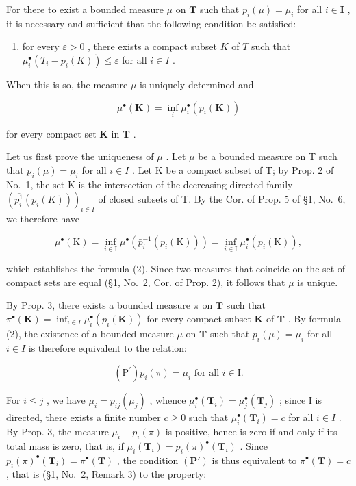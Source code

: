 For there to exist a bounded measure \(\mu\) on \(\mathbf{T}\) such that \(p_i(\mu) = \mu_i\) for all \(i \in \mathbf{I}\) , it is necessary and sufficient that the following condition be satisfied:

\begin{enumerate}
\def\labelenumi{(\Alph{enumi})}
\setcounter{enumi}{15}
\tightlist
\item
  for every \(\varepsilon > 0\) , there exists a compact subset \(K\) of \(T\) such that \(\mu_i^\bullet(T_i - p_i(K)) \leqslant \varepsilon\) for all \(i \in I\) .
\end{enumerate}

When this is so, the measure \(\mu\) is uniquely determined and

\[
\mu^ {\bullet} (\mathbf {K}) = \inf _ {i} \mu_ {i} ^ {\bullet} (p _ {i} (\mathbf {K}))\tag{2}
\]

for every compact set \(\mathbf{K}\) in \(\mathbf{T}\) .

Let us first prove the uniqueness of \(\mu\) . Let \(\mu\) be a bounded measure on T such that \(p_i(\mu) = \mu_i\) for all \(i \in I\) . Let K be a compact subset of T; by Prop. 2 of No.~1, the set K is the intersection of the decreasing directed family \(\left(\overline{p_i^1}(p_i(K))\right)_{i \in I}\) of closed subsets of T. By the Cor. of Prop. 5 of §1, No.~6, we therefore have

\[
\mu^ {\bullet} (\mathrm{K}) = \inf _ {i \in \mathrm{I}} \mu^ {\bullet} \left(\bar {p} _ {i} ^ {- 1} (p _ {i} (\mathrm{K}))\right) = \inf _ {i \in \mathrm{I}} \mu_ {i} ^ {\bullet} \left(p _ {i} (\mathrm{K})\right),
\]

which establishes the formula (2). Since two measures that coincide on the set of compact sets are equal (§1, No.~2, Cor. of Prop. 2), it follows that \(\mu\) is unique.

By Prop. 3, there exists a bounded measure \(\pi\) on \(\mathbf{T}\) such that \(\pi^{\bullet}(\mathbf{K}) = \inf_{i\in I}\mu_i^\bullet (p_i(\mathbf{K}))\) for every compact subset \(\mathbf{K}\) of \(\mathbf{T}\) . By formula (2), the existence of a bounded measure \(\mu\) on \(\mathbf{T}\) such that \(p_i(\mu) = \mu_i\) for all \(i\in I\) is therefore equivalent to the relation:

\[
\left(\mathrm{P} ^ {\prime}\right) p _ {i} (\pi) = \mu_ {i} \text { for all } i \in \mathrm{I}.
\]

For \(i \leqslant j\) , we have \(\mu_i = p_{ij}(\mu_j)\) , whence \(\mu_i^\bullet (\mathbf{T}_i) = \mu_j^\bullet (\mathbf{T}_j)\) ; since I is directed, there exists a finite number \(c \geqslant 0\) such that \(\mu_i^\bullet (\mathbf{T}_i) = c\) for all \(i \in I\) . By Prop. 3, the measure \(\mu_i - p_i(\pi)\) is positive, hence is zero if and only if its total mass is zero, that is, if \(\mu_i(\mathbf{T}_i) = p_i(\pi)^\bullet (\mathbf{T}_i)\) . Since \(p_i(\pi)^\bullet (\mathbf{T}_i) = \pi^\bullet (\mathbf{T})\) , the condition \((\mathbf{P}')\) is thus equivalent to \(\pi^\bullet (\mathbf{T}) = c\) , that is (§1, No.~2, Remark 3) to the property:

